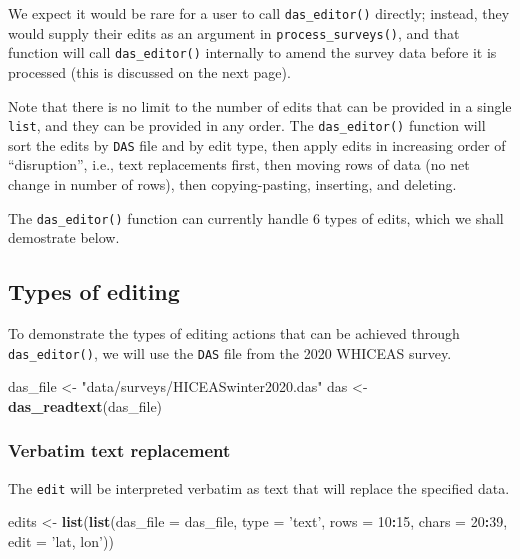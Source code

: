\documentclass[
]{book}
\newenvironment{Shaded}{\begin{snugshade}}{\end{snugshade}}
\newcommand{\DataTypeTok}[1]{\textcolor[rgb]{0.13,0.29,0.53}{#1}}
\newcommand{\DecValTok}[1]{\textcolor[rgb]{0.00,0.00,0.81}{#1}}
\newcommand{\KeywordTok}[1]{\textcolor[rgb]{0.13,0.29,0.53}{\textbf{#1}}}
\newcommand{\NormalTok}[1]{#1}
\newcommand{\OperatorTok}[1]{\textcolor[rgb]{0.81,0.36,0.00}{\textbf{#1}}}
\newcommand{\StringTok}[1]{\textcolor[rgb]{0.31,0.60,0.02}{#1}}
\begin{document}
We expect it would be rare for a user to call \texttt{das\_editor()} directly; instead, they would supply their edits as an argument in \texttt{process\_surveys()}, and that function will call \texttt{das\_editor()} internally to amend the survey data before it is processed (this is discussed on the next page).

Note that there is no limit to the number of edits that can be provided in a single \texttt{list}, and they can be provided in any order. The \texttt{das\_editor()} function will sort the edits by \texttt{DAS} file and by edit type, then apply edits in increasing order of ``disruption'', i.e., text replacements first, then moving rows of data (no net change in number of rows), then copying-pasting, inserting, and deleting.

The \texttt{das\_editor()} function can currently handle 6 types of edits, which we shall demostrate below.

\hypertarget{types-of-editing}{%
\subsection*{Types of editing}\label{types-of-editing}}

To demonstrate the types of editing actions that can be achieved through \texttt{das\_editor()}, we will use the \texttt{DAS} file from the 2020 WHICEAS survey.

\begin{Shaded}
\begin{Highlighting}[]
\NormalTok{das_file <-}\StringTok{ "data/surveys/HICEASwinter2020.das"}
\NormalTok{das <-}\StringTok{ }\KeywordTok{das_readtext}\NormalTok{(das_file)}
\end{Highlighting}
\end{Shaded}

\hypertarget{verbatim-text-replacement}{%
\subsubsection*{Verbatim text replacement}\label{verbatim-text-replacement}}

The \texttt{edit} will be interpreted verbatim as text that will replace the specified data.

\begin{Shaded}
\begin{Highlighting}[]
\NormalTok{edits <-}\StringTok{ }\KeywordTok{list}\NormalTok{(}\KeywordTok{list}\NormalTok{(}\DataTypeTok{das_file =}\NormalTok{ das_file, }
                   \DataTypeTok{type =} \StringTok{'text'}\NormalTok{,}
                   \DataTypeTok{rows =} \DecValTok{10}\OperatorTok{:}\DecValTok{15}\NormalTok{, }
                   \DataTypeTok{chars =} \DecValTok{20}\OperatorTok{:}\DecValTok{39}\NormalTok{, }
                   \DataTypeTok{edit =} \StringTok{'lat, lon'}\NormalTok{))}
\end{Highlighting}
\end{Shaded}
\end{document}
